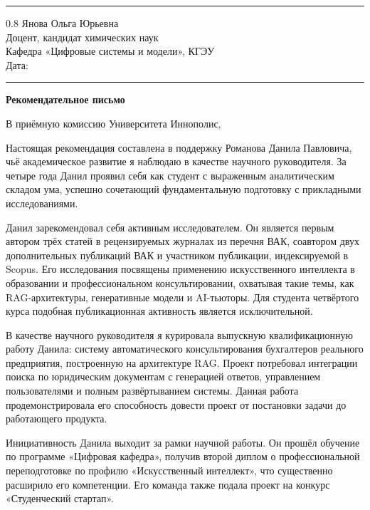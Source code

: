 \documentclass[a4paper,12pt]{article}
\begin{document}
\vspace{4pt}
\noindent\rule{\textwidth}{0.8pt}

\begin{flushright}
  \begin{spacing}{0.8}
    Янова Ольга Юрьевна\\
    Доцент, кандидат химических наук\\
    Кафедра «Цифровые системы и модели», КГЭУ\\[6pt]
    Дата: \rule{4cm}{0.4pt}
  \end{spacing}
\end{flushright}

\begin{center}
  {\Large\bfseries Рекомендательное письмо}
\end{center}

В приёмную комиссию Университета Иннополис,

Настоящая рекомендация составлена в поддержку Романова Данила Павловича, чьё академическое развитие я наблюдаю в качестве научного руководителя. За четыре года Данил проявил себя как студент с выраженным аналитическим складом ума, успешно сочетающий фундаментальную подготовку с прикладными исследованиями.

Данил зарекомендовал себя активным исследователем. Он является первым автором трёх статей в рецензируемых журналах из перечня ВАК, соавтором двух дополнительных публикаций ВАК и участником публикации, индексируемой в Scopus. Его исследования посвящены применению искусственного интеллекта в образовании и профессиональном консультировании, охватывая такие темы, как RAG-архитектуры, генеративные модели и AI-тьюторы. Для студента четвёртого курса подобная публикационная активность является исключительной.

В качестве научного руководителя я курировала выпускную квалификационную работу Данила: систему автоматического консультирования бухгалтеров реального предприятия, построенную на архитектуре RAG. Проект потребовал интеграции поиска по юридическим документам с генерацией ответов, управлением пользователями и полным развёртыванием системы. Данная работа продемонстрировала его способность довести проект от постановки задачи до работающего продукта.

Инициативность Данила выходит за рамки научной работы. Он прошёл обучение по программе «Цифровая кафедра», получив второй диплом о профессиональной переподготовке по профилю «Искусственный интеллект», что существенно расширило его компетенции. Его команда также подала проект на конкурс «Студенческий стартап».
\end{document}
